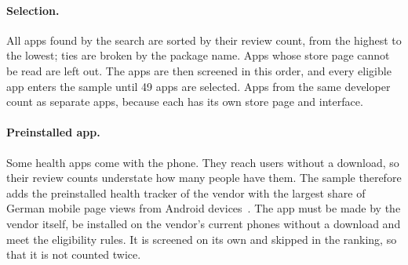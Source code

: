 \paragraph{Selection.} All apps found by the search are sorted by their review
count, from the highest to the lowest; ties are broken by the package name.
Apps whose store page cannot be read are left out. The apps are then screened
in this order, and every eligible app enters the sample until 49 apps are
selected. Apps from the same developer count as separate apps, because each
has its own store page and interface.

\paragraph{Preinstalled app.} Some health apps come with the phone. They reach users without a download, so
their review counts understate how many people have them. The sample therefore
adds the preinstalled health tracker of the vendor with the largest share of
German mobile page views from Android
devices~\parencite{statcounter2026vendor}. The app must be made by the vendor
itself, be installed on the vendor's current phones without a download and
meet the eligibility rules. It is screened on its own and skipped in the
ranking, so that it is not counted twice.
